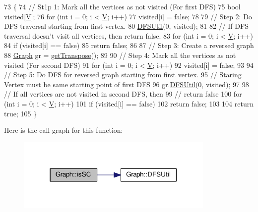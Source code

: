 \begin{DoxyCode}
73 \{
74     \textcolor{comment}{// St1p 1: Mark all the vertices as not visited (For first DFS)}
75     \textcolor{keywordtype}{bool} visited[\hyperlink{classGraph_a2b722f7cfa7a21e4cb5fae488b3d4dcc}{V}];
76     \textcolor{keywordflow}{for} (\textcolor{keywordtype}{int} i = 0; i < \hyperlink{classGraph_a2b722f7cfa7a21e4cb5fae488b3d4dcc}{V}; i++)
77         visited[i] = \textcolor{keyword}{false};
78  
79     \textcolor{comment}{// Step 2: Do DFS traversal starting from first vertex.}
80     \hyperlink{classGraph_a47d02784c897a7e0d42a29c698161648}{DFSUtil}(0, visited);
81  
82     \textcolor{comment}{// If DFS traversal doesn’t visit all vertices, then return false.}
83     \textcolor{keywordflow}{for} (\textcolor{keywordtype}{int} i = 0; i < \hyperlink{classGraph_a2b722f7cfa7a21e4cb5fae488b3d4dcc}{V}; i++)
84         \textcolor{keywordflow}{if} (visited[i] == \textcolor{keyword}{false})
85             \textcolor{keywordflow}{return} \textcolor{keyword}{false};
86  
87     \textcolor{comment}{// Step 3: Create a reversed graph}
88     \hyperlink{classGraph}{Graph} gr = \hyperlink{classGraph_abdaf0cb08811d4b30f4c85f632e0e181}{getTranspose}();
89  
90     \textcolor{comment}{// Step 4: Mark all the vertices as not visited (For second DFS)}
91     \textcolor{keywordflow}{for} (\textcolor{keywordtype}{int} i = 0; i < \hyperlink{classGraph_a2b722f7cfa7a21e4cb5fae488b3d4dcc}{V}; i++)
92         visited[i] = \textcolor{keyword}{false};
93  
94     \textcolor{comment}{// Step 5: Do DFS for reversed graph starting from first vertex.}
95     \textcolor{comment}{// Staring Vertex must be same starting point of first DFS}
96     gr.\hyperlink{classGraph_a47d02784c897a7e0d42a29c698161648}{DFSUtil}(0, visited);
97  
98     \textcolor{comment}{// If all vertices are not visited in second DFS, then}
99     \textcolor{comment}{// return false}
100     \textcolor{keywordflow}{for} (\textcolor{keywordtype}{int} i = 0; i < \hyperlink{classGraph_a2b722f7cfa7a21e4cb5fae488b3d4dcc}{V}; i++)
101         \textcolor{keywordflow}{if} (visited[i] == \textcolor{keyword}{false})
102             \textcolor{keywordflow}{return} \textcolor{keyword}{false};
103  
104     \textcolor{keywordflow}{return} \textcolor{keyword}{true};
105 \}
\end{DoxyCode}


Here is the call graph for this function\+:
\nopagebreak
\begin{figure}[H]
\begin{center}
\leavevmode
\includegraphics[width=271pt]{classGraph_af761afe9665b65f11beb2a604fd1a326_cgraph}
\end{center}
\end{figure}




